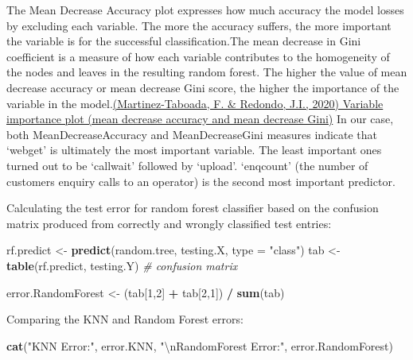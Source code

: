 \documentclass[
]{article}
\newenvironment{Shaded}{\begin{snugshade}}{\end{snugshade}}
\newcommand{\CharTok}[1]{\textcolor[rgb]{0.31,0.60,0.02}{#1}}
\newcommand{\CommentTok}[1]{\textcolor[rgb]{0.56,0.35,0.01}{\textit{#1}}}
\newcommand{\DataTypeTok}[1]{\textcolor[rgb]{0.13,0.29,0.53}{#1}}
\newcommand{\DecValTok}[1]{\textcolor[rgb]{0.00,0.00,0.81}{#1}}
\newcommand{\KeywordTok}[1]{\textcolor[rgb]{0.13,0.29,0.53}{\textbf{#1}}}
\newcommand{\NormalTok}[1]{#1}
\newcommand{\OperatorTok}[1]{\textcolor[rgb]{0.81,0.36,0.00}{\textbf{#1}}}
\newcommand{\StringTok}[1]{\textcolor[rgb]{0.31,0.60,0.02}{#1}}
\begin{document}
The Mean Decrease Accuracy plot expresses how much accuracy the model
losses by excluding each variable. The more the accuracy suffers, the
more important the variable is for the successful classification.The
mean decrease in Gini coefficient is a measure of how each variable
contributes to the homogeneity of the nodes and leaves in the resulting
random forest. The higher the value of mean decrease accuracy or mean
decrease Gini score, the higher the importance of the variable in the
model.\href{https://doi.org/10.1371/journal.pone.0230799.g002}{(Martinez-Taboada,
F. \& Redondo, J.I., 2020) Variable importance plot (mean decrease
accuracy and mean decrease Gini)} In our case, both MeanDecreaseAccuracy
and MeanDecreaseGini measures indicate that `webget' is ultimately the
most important variable. The least important ones turned out to be
`callwait' followed by `upload'. `enqcount' (the number of customers
enquiry calls to an operator) is the second most important predictor.

Calculating the test error for random forest classifier based on the
confusion matrix produced from correctly and wrongly classified test
entries:

\begin{Shaded}
\begin{Highlighting}[]
\NormalTok{rf.predict <-}\StringTok{ }\KeywordTok{predict}\NormalTok{(random.tree, testing.X, }\DataTypeTok{type =} \StringTok{"class"}\NormalTok{)}
\NormalTok{tab <-}\StringTok{ }\KeywordTok{table}\NormalTok{(rf.predict, testing.Y) }\CommentTok{# confusion matrix}

\NormalTok{error.RandomForest <-}\StringTok{ }\NormalTok{(tab[}\DecValTok{1}\NormalTok{,}\DecValTok{2}\NormalTok{] }\OperatorTok{+}\StringTok{ }\NormalTok{tab[}\DecValTok{2}\NormalTok{,}\DecValTok{1}\NormalTok{]) }\OperatorTok{/}\StringTok{ }\KeywordTok{sum}\NormalTok{(tab)}
\end{Highlighting}
\end{Shaded}

Comparing the KNN and Random Forest errors:

\begin{Shaded}
\begin{Highlighting}[]
\KeywordTok{cat}\NormalTok{(}\StringTok{"KNN Error:"}\NormalTok{, error.KNN, }\StringTok{"}\CharTok{\textbackslash{}n}\StringTok{RandomForest Error:"}\NormalTok{, error.RandomForest)}
\end{Highlighting}
\end{Shaded}
\end{document}
